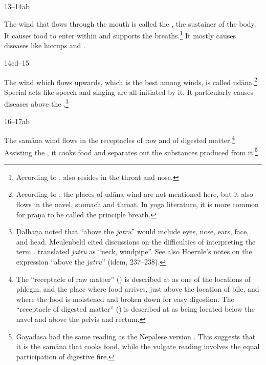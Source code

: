 \begin{translation}
\item[13--14ab] 

The wind that flows through the mouth is called the , the sustainer of the body.  It causes food to enter within and
supports the breaths.\footnote{According to
    ,  also resides in the throat
    and nose.} It mostly causes diseases like hiccups and
    .



\item[14cd--15] 

The wind which flows upwards, which is the best among winds, is called
udāna.\footnote{According to , the places
    of udāna wind are not mentioned here, but it also flows in the navel,
    stomach and throat.  In yoga literature, it is more common for prāṇa
    to be called the principle breath.} Special acts like speech and
    singing are all initiated by it. It particularly causes diseases above
    the .\footnote{Ḍalhaṇa noted that “above the
        \emph{jatru}” would include eyes, nose, ears, face, and head.
        Meulenbeld cited discussions on the difficulties of interpreting the
        term  \citep[465]{meul-1974}.  \citet[\S\S62,
        98]{hoer-1907} translated \emph{jatru} as “neck, windpipe”. See also
        Hoernle's notes on the expression “above the \emph{jatru}” (idem,
        237--238).}

\item [16--17ab]

The samāna wind flows in the receptacles of raw and of digested
matter.\footnote{The “receptacle of raw matter” () is
    described at  as one of the locations of phlegm, and
    the place where food arrives, just above the location of bile, and
    where the food is moistened and broken down for easy digestion.  The
    “receptacle of digested matter” () is described at
     as being located below the navel and above the pelvis
    and rectum.} Assisting the , it cooks food
    and separates out the substances produced from it.\footnote{Gayadāsa
        had the same reading  as the Nepalese version
        \citep[260, note~1 and the text of the \emph{Nyācacandrikā}]{vulgate}.
        This suggests that it is the samāna that cooks food, while the
        vulgate reading involves the equal participation of digestive fire.}


\end{translation}
